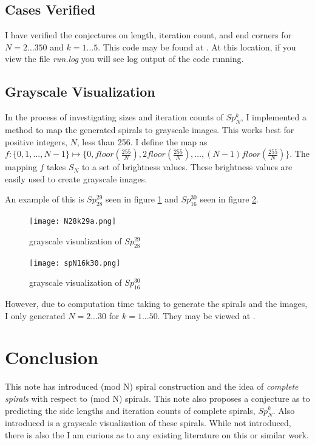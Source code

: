 \documentclass[11pt]{amsart}
\theoremstyle{mydef}
\begin{document}
\subsection{Cases Verified}
I have verified the conjectures on length, iteration count, and end corners for $N=2\ldots350$ and $k=1\ldots5$. This code may be found at \cite{PySquare}. At this location, if you view the file \textit{run.log} you will see log output of the code running.

\subsection{Grayscale Visualization}

In the process of investigating sizes and iteration counts of $Sp^k_N$, I implemented a method to map the generated spirals to grayscale images. This works best for positive integers, $N$, less than 256. I define the map as $f : \{ 0, 1, \ldots, N-1 \} \mapsto \{ 0, floor(\frac{255}{N}), 2floor(\frac{255}{N}), \ldots, (N-1)floor(\frac{255}{N}) \}$. The mapping $f$ takes $S_N$ to a set of brightness values. These brightness values are easily used to create grayscale images.

An example of this is $Sp^{29}_{28}$ seen in figure \ref{fig:viz2928} and $Sp^{30}_{16}$ seen in figure \ref{fig:viz1630}.

\begin{figure}[h]
\centering
\texttt{[image: N28k29a.png]}
\caption{grayscale visualization of $Sp^{29}_{28}$}
\label{fig:viz2928}
\end{figure}

\begin{figure}
\centering
\texttt{[image: spN16k30.png]}
\caption{grayscale visualization of $Sp^{30}_{16}$}
\label{fig:viz1630}
\end{figure}

However, due to computation time taking to generate the spirals and the images, I only generated $N=2...30$ for $k=1...50$. They may be viewed at \cite{GraySquare}.

\section{Conclusion}
This note has introduced (mod N) spiral construction and the idea of \textit{complete spirals} with respect to (mod N) spirals. This note also proposes a conjecture as to predicting the side lengths and iteration counts of complete spirals, $Sp^k_N$. Also introduced is a grayscale visualization of these spirals. While not introduced, there is also the I am curious as to any existing literature on this or similar work.
\end{document}
